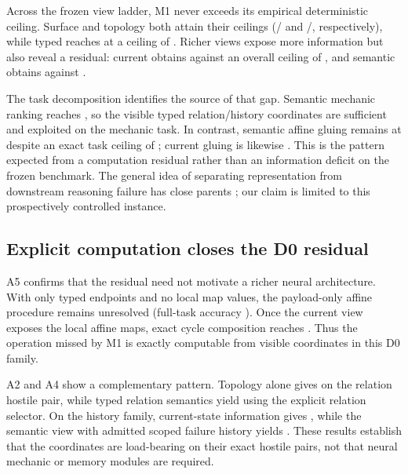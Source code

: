 Across the frozen view ladder, M1 never exceeds its empirical deterministic ceiling. Surface and topology both attain their ceilings (\MOneSurfaceAccuracy/\MOneSurfaceCeiling{} and \MOneTopologyAccuracy/\MOneTopologyCeiling{}, respectively), while typed reaches \MOneTypedAccuracy{} at a ceiling of \MOneTypedCeiling{}. Richer views expose more information but also reveal a residual: current obtains \MOneCurrentAccuracy{} against an overall ceiling of \MOneCurrentCeiling{}, and semantic obtains \MOneSemanticAccuracy{} against \MOneSemanticCeiling{}.

The task decomposition identifies the source of that gap. Semantic mechanic ranking reaches \MOneSemanticMechanicAccuracy{}, so the visible typed relation/history coordinates are sufficient and exploited on the mechanic task. In contrast, semantic affine gluing remains at \MOneSemanticGluingAccuracy{} despite an exact task ceiling of \MOneSemanticGluingCeiling{}; current gluing is likewise \MOneCurrentGluingAccuracy{}. This is the pattern expected from a computation residual rather than an information deficit on the frozen benchmark. The general idea of separating representation from downstream reasoning failure has close parents \citep{liem2026temporal,anonymous2026chokepoints}; our claim is limited to this prospectively controlled instance.

\subsection{Explicit computation closes the D0 residual}

A5 confirms that the residual need not motivate a richer neural architecture. With only typed endpoints and no local map values, the payload-only affine procedure remains unresolved (full-task accuracy \AFiveTypedAccuracy{}). Once the current view exposes the local affine maps, exact cycle composition reaches \AFiveCurrentAccuracy{}. Thus the operation missed by M1 is exactly computable from visible coordinates in this D0 family.

A2 and A4 show a complementary pattern. Topology alone gives \ATwoTopologyAccuracy{} on the relation hostile pair, while typed relation semantics yield \ATwoTypedAccuracy{} using the explicit relation selector. On the history family, current-state information gives \AFourCurrentAccuracy{}, while the semantic view with admitted scoped failure history yields \AFourSemanticAccuracy{}. These results establish that the coordinates are load-bearing on their exact hostile pairs, not that neural mechanic or memory modules are required.

